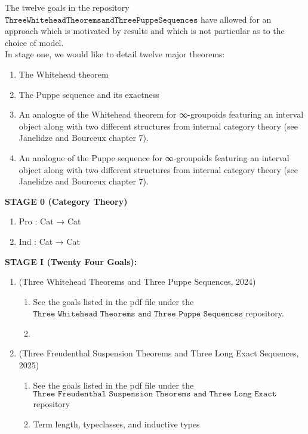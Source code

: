 \documentclass{book}
\begin{document}
The twelve goals in the repository $\texttt{ThreeWhiteheadTheoremsandThreePuppeSequences}$ have allowed for an approach which is motivated by results and which is not particular as to the choice of model. \\

\iffalse
{\bf Why Model} ...
\fi

\iffalse
https://leanprover.zulipchat.com/#narrow/stream/116395-maths/topic/2-categories
\fi

In stage one, we would like to detail twelve major theorems:

\begin{enumerate}
\item The Whitehead theorem
\item The Puppe sequence and its exactness
\item An analogue of the Whitehead theorem for ∞-groupoids featuring an interval object along with two different structures from internal category theory (see Janelidze and Bourceux chapter 7).
\item An analogue of the Puppe sequence for ∞-groupoids featuring an interval object along with two different structures from internal category theory (see Janelidze and Bourceux chapter 7).
\end{enumerate}

{\bf STAGE 0 (Category Theory)}
\begin{enumerate}
\item Pro : Cat → Cat
\item Ind : Cat → Cat
\end{enumerate}



{\bf STAGE I (Twenty Four Goals):}
\begin{enumerate}
\item (Three Whitehead Theorems and Three Puppe Sequences, 2024)
\begin{enumerate}
\item See the goals listed in the pdf file under the $\texttt{Three Whitehead Theorems and Three Puppe Sequences}$ repository.
\item 
\end{enumerate}
\item (Three Freudenthal Suspension Theorems and Three Long Exact Sequences, 2025)
\begin{enumerate}
\item See the goals listed in the pdf file under the $\texttt{Three Freudenthal Suspension Theorems and Three Long Exact Sequences}$ repository 
\item Term length, typeclasses, and inductive types
\end{enumerate}
\end{enumerate}
\end{document}
